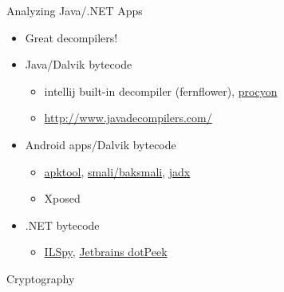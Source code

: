 \begin{frame}[fragile]
  {Analyzing Java/.NET Apps}

  \begin{itemize}
    \item Great decompilers!
    \item Java/Dalvik bytecode
      \begin{itemize}
        \item intellij built-in decompiler (fernflower),
          \href{https://bitbucket.org/mstrobel/procyon/}{procyon}
        \item \url{http://www.javadecompilers.com/}
      \end{itemize}
    \item Android apps/Dalvik bytecode
      \begin{itemize}
        \item \href{http://ibotpeaches.github.io/Apktool/}{apktool},
          \href{https://bitbucket.org/JesusFreke/smali/}{smali/baksmali},
          \href{https://github.com/skylot/jadx}{jadx}
        \item Xposed
      \end{itemize}
    \item .NET bytecode
      \begin{itemize}
        \item \href{http://ilspy.net/}{ILSpy}, \href{https://www.jetbrains.com/decompiler/}{Jetbrains dotPeek}
      \end{itemize}

  \end{itemize}

\end{frame}





\begin{frame}[plain]

  {\Huge Cryptography}
\end{frame}


